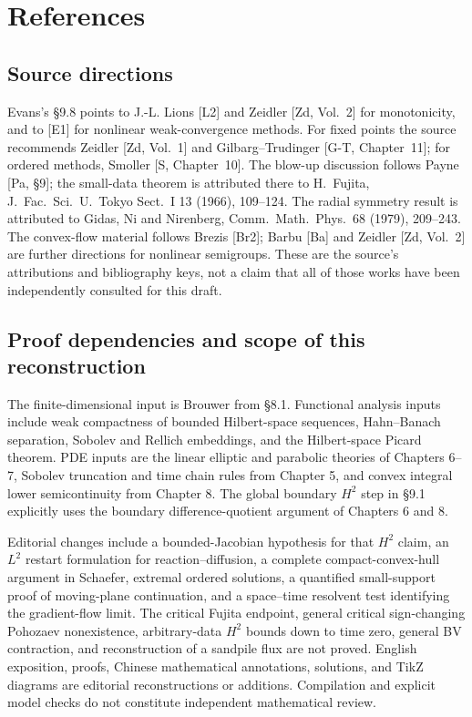 \section{References}
\label{sec:9-8}
\subsection*{Source directions}
Evans's \S9.8 points to J.-L. Lions [L2] and Zeidler [Zd, Vol.~2] for
monotonicity, and to [E1] for nonlinear weak-convergence methods.
For fixed points the source recommends Zeidler [Zd, Vol.~1] and
Gilbarg--Trudinger [G-T, Chapter~11]; for ordered methods, Smoller
[S, Chapter~10]. The blow-up discussion follows Payne [Pa, \S9]; the
small-data theorem is attributed there to H.~Fujita, J.~Fac.~Sci.~U.~Tokyo
Sect.~I 13 (1966), 109--124. The radial symmetry result is attributed to
Gidas, Ni and Nirenberg, Comm.~Math.~Phys.~68 (1979), 209--243.
The convex-flow material follows Brezis [Br2]; Barbu [Ba] and Zeidler
[Zd, Vol.~2] are further directions for nonlinear semigroups.
These are the source's attributions and bibliography keys, not a claim
that all of those works have been independently consulted for this draft.

\subsection*{Proof dependencies and scope of this reconstruction}
The finite-dimensional input is Brouwer from \S8.1. Functional analysis
inputs include weak compactness of bounded Hilbert-space sequences,
Hahn--Banach separation, Sobolev and Rellich embeddings, and the
Hilbert-space Picard theorem. PDE inputs are the linear elliptic and
parabolic theories of Chapters 6--7, Sobolev truncation and time chain
rules from Chapter 5, and convex integral lower semicontinuity from
Chapter 8. The global boundary $H^2$ step in \S9.1 explicitly uses the
boundary difference-quotient argument of Chapters 6 and 8.

Editorial changes include a bounded-Jacobian hypothesis for that $H^2$
claim, an $L^2$ restart formulation for reaction--diffusion, a complete
compact-convex-hull argument in Schaefer, extremal ordered solutions,
a quantified small-support proof of moving-plane continuation, and a
space--time resolvent test identifying the gradient-flow limit.
The critical Fujita endpoint, general critical sign-changing Pohozaev
nonexistence, arbitrary-data $H^2$ bounds down to time zero, general
BV contraction, and reconstruction of a sandpile flux are not proved.
English exposition, proofs, Chinese mathematical annotations, solutions,
and TikZ diagrams are editorial reconstructions or additions.
Compilation and explicit model checks do not constitute independent
mathematical review.
